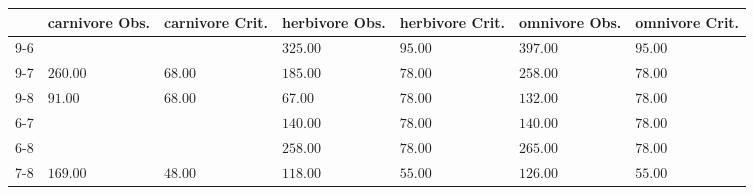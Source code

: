\begin{table}[ht]
\centering
\begin{tabular}{rllllll}
  \toprule
 & carnivore Obs. & carnivore Crit. & herbivore Obs. & herbivore Crit. & omnivore Obs. & omnivore Crit. \\ 
  \midrule
9-6 &  &  & \(\mathbf{325.00}\) & \(\mathbf{95.00}\) & \(\mathbf{397.00}\) & \(\mathbf{95.00}\) \\ 
  9-7 & \(\mathbf{260.00}\) & \(\mathbf{68.00}\) & \(\mathbf{185.00}\) & \(\mathbf{78.00}\) & \(\mathbf{258.00}\) & \(\mathbf{78.00}\) \\ 
  9-8 & \(\mathbf{91.00}\) & \(\mathbf{68.00}\) & 67.00 & 78.00 & \(\mathbf{132.00}\) & \(\mathbf{78.00}\) \\ 
  6-7 &  &  & \(\mathbf{140.00}\) & \(\mathbf{78.00}\) & \(\mathbf{140.00}\) & \(\mathbf{78.00}\) \\ 
  6-8 &  &  & \(\mathbf{258.00}\) & \(\mathbf{78.00}\) & \(\mathbf{265.00}\) & \(\mathbf{78.00}\) \\ 
  7-8 & \(\mathbf{169.00}\) & \(\mathbf{48.00}\) & \(\mathbf{118.00}\) & \(\mathbf{55.00}\) & \(\mathbf{126.00}\) & \(\mathbf{55.00}\) \\ 
   \bottomrule
\end{tabular}
\end{table}
